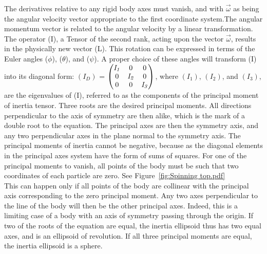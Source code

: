 \documentclass[a4paper, 10pt, onepage]{elegantbook}
\begin{document}
{The derivatives relative to any rigid body axes must vanish, and with $\vec{\omega}$ as being the angular velocity vector appropriate to the first coordinate system.The angular momentum vector is related to the angular velocity by a linear transformation. The operator (I), a Tensor of the second rank, acting upon the vector $\vec{\omega}$, results in the physically new vector (L). This rotation can be expressed in terms of the Euler angles ($\phi$), ($\theta$), and ($\psi$). A proper choice of these angles will transform (I) into its diagonal form:
$(I_D)$ = $\begin{pmatrix}\mathit{I_1} & 0 & 0 \cr 0 & \mathit{I_2} & 0 \cr 0 & 0 & \mathit{I_3} \end{pmatrix}$, where $(I_1)$, $(I_2)$, and $(I_3)$, are the eigenvalues of (I), referred to as the components of the principal moment of inertia tensor. Three roots are the desired principal moments.
All directions perpendicular to the axis of symmetry are then alike, which is the mark of a double root to the equation. The principal axes are then the symmetry axis, and any two perpendicular axes in the plane normal to the symmetry axis. The principal moments of inertia cannot be negative, because as the diagonal elements in the principal axes system have the form of sums of squares. For one of the principal moments to vanish, all points of the body must be such that two coordinates of each particle are zero. See Figure~\ref{fig:Spinning top.pdf}  \\
This can happen only if all points of the body are collinear with the principal axis corresponding to the zero principal moment. Any two axes perpendicular to the line of the body will then be the other principal axes. Indeed, this is a limiting case of a body with an axis of symmetry passing through the origin. If two of the roots of the equation are equal, the inertia ellipsoid thus has two equal axes, and is an ellipsoid of revolution. If all three principal moments are equal, the inertia ellipsoid is a sphere.  \\
}
\end{document}
